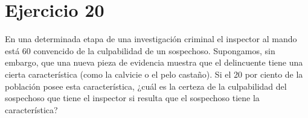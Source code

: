 \documentclass[12pt]{article}
\begin{document}
\section{Ejercicio 20}
 En una determinada etapa de una investigación criminal el inspector al mando está 60 %
convencido de la culpabilidad de un sospechoso. Supongamos, sin embargo, que una nueva
pieza de evidencia muestra que el delincuente tiene una cierta característica (como la calvicie
o el pelo castaño). Si el 20 por ciento de la población posee esta característica, ¿cuál es la
certeza de la culpabilidad del sospechoso que tiene el inspector si resulta que el sospechoso
tiene la característica?
\end{document}
